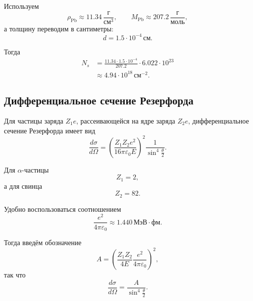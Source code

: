 \documentclass[../final.tex]{subfiles}
\begin{document}
Используем
%
\begin{equation*}
    \rho_{\mathrm{Pb}}
    \approx
    11.34\,\frac{\text{г}}{\text{см}^3},
    \qquad
    M_{\mathrm{Pb}}
    \approx
    207.2\,\frac{\text{г}}{\text{моль}},
\end{equation*}
%
а толщину переводим в сантиметры:
%
\begin{equation*}
    d
    =
    1.5\cdot10^{-4}\,\text{см}.
\end{equation*}

Тогда
%
\begin{align*}
    N_s
    &=
    \frac{
        11.34\cdot1.5\cdot10^{-4}
    }{207.2}
    \cdot
    6.022\cdot10^{23}
    \\
    &\approx
    4.94\cdot10^{18}\,\text{см}^{-2}.
\end{align*}



\subsection*{Дифференциальное сечение Резерфорда}

Для частицы заряда $Z_1e$, рассеивающейся на ядре заряда $Z_2e$,
дифференциальное сечение Резерфорда имеет вид
%
\begin{equation*}
    \frac{d\sigma}{d\Omega}
    =
    \left(
        \frac{Z_1Z_2e^2}
             {16\pi\varepsilon_0E}
    \right)^2
    \frac{1}{\sin^4\frac{\theta}{2}}.
\end{equation*}

Для $\alpha$-частицы
%
\begin{equation*}
    Z_1=2,
\end{equation*}
%
а для свинца
%
\begin{equation*}
    Z_2=82.
\end{equation*}

Удобно воспользоваться соотношением
%
\begin{equation*}
    \frac{e^2}{4\pi\varepsilon_0}
    \approx
    1.440\,\text{МэВ}\cdot\text{фм}.
\end{equation*}

Тогда введём обозначение
%
\begin{equation*}
    A
    =
    \left(
        \frac{Z_1Z_2}{4E}
        \frac{e^2}{4\pi\varepsilon_0}
    \right)^2,
\end{equation*}
%
так что
%
\begin{equation*}
    \frac{d\sigma}{d\Omega}
    =
    \frac{A}{\sin^4\frac{\theta}{2}}.
\end{equation*}
\end{document}
